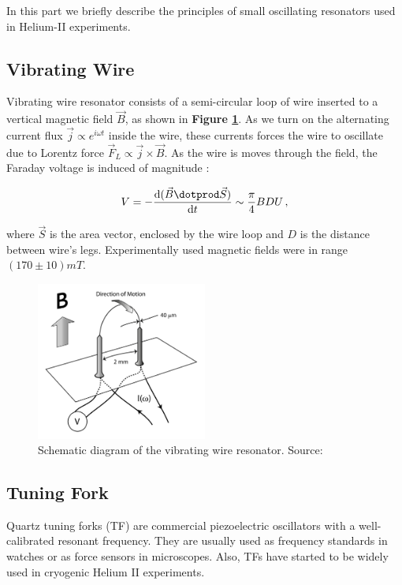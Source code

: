 In this part we briefly describe the principles of small oscillating resonators used in Helium-II experiments.

\subsection*{Vibrating Wire}

Vibrating wire resonator consists of a semi-circular loop of wire inserted to a vertical magnetic field $\vec{B}$, as shown in \textbf{Figure \ref{wire}}. As we turn on the alternating current flux $\vec{j} \propto e^{i\omega t}$ inside the wire, these currents forces the wire to oscillate due to Lorentz force $\vec{F}_L \propto \vec{j} \times \vec{B} $. As the wire is moves through the field, the Faraday voltage is induced of magnitude \cite{universal_scaling}:

\begin{equation}
V = - \frac{\text{d} (\vec{B} \dotprod \vec{S})}{\text{d} t}
\sim \frac{\pi}{4} BDU\,,
\end{equation}

where $\vec{S}$ is the area vector, enclosed by the wire loop and $D$ is the distance between wire's legs. Experimentally used magnetic fields were in range $(170 \pm 10) \unit{mT}$.

\begin{figure}[h]
	\centering
	\includegraphics[width=0.5\textwidth]{graphics/exp/wire}
	\caption{Schematic diagram of the vibrating wire resonator. Source: \cite{universal_scaling}}
	\label{wire}
\end{figure}

\newpage

\subsection*{Tuning Fork}

Quartz tuning forks (TF) are commercial piezoelectric oscillators with a well-calibrated resonant frequency. They are usually used as frequency standards in watches or as force sensors in microscopes. Also, TFs have started to be widely used in cryogenic Helium II experiments.

